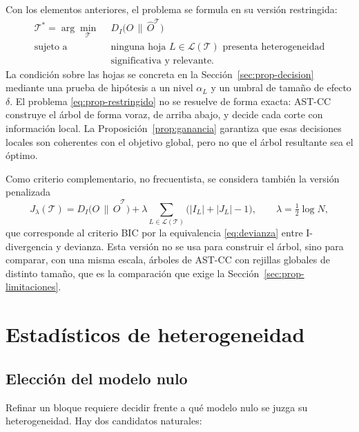 Con los elementos anteriores, el problema se formula en su versión restringida:
\begin{equation}\label{eq:prop-restringido}
  \begin{aligned}
    \mathcal{T}^\ast = \arg\min_{\mathcal{T}}\ \ & D_I\bigl(O\,\|\,\hat O^{\mathcal{T}}\bigr)\\
    \text{sujeto a}\ \ & \text{ninguna hoja } L\in\mathcal{L}(\mathcal{T})
      \text{ presenta heterogeneidad}\\
      & \text{significativa y relevante.}
  \end{aligned}
\end{equation}
La condición sobre las hojas se concreta en la Sección~\ref{sec:prop-decision}
mediante una prueba de hipótesis a un nivel $\alpha_L$ y un umbral de tamaño
de efecto $\delta$. El problema \eqref{eq:prop-restringido} no se resuelve de
forma exacta: AST-CC construye el árbol de forma voraz, de arriba abajo, y
decide cada corte con información local. La Proposición~\ref{prop:ganancia}
garantiza que esas decisiones locales son coherentes con el objetivo global,
pero no que el árbol resultante sea el óptimo.

Como criterio complementario, no frecuentista, se considera también la versión
penalizada
\begin{equation}\label{eq:prop-bic}
  J_\lambda(\mathcal{T}) = D_I\bigl(O\,\|\,\hat O^{\mathcal{T}}\bigr)
  + \lambda \sum_{L\in\mathcal{L}(\mathcal{T})}\bigl(|I_L|+|J_L|-1\bigr),
  \qquad \lambda = \tfrac12\log N,
\end{equation}
que corresponde al criterio BIC por la equivalencia \eqref{eq:devianza} entre
I-divergencia y devianza. Esta versión no se usa para construir el árbol, sino
para comparar, con una misma escala, árboles de AST-CC con rejillas globales de
distinto tamaño, que es la comparación que exige la
Sección~\ref{sec:prop-limitaciones}.

\section{Estadísticos de heterogeneidad}\label{sec:prop-estadisticos}

\subsection{Elección del modelo nulo}

Refinar un bloque requiere decidir frente a qué modelo nulo se juzga su
heterogeneidad. Hay dos candidatos naturales:

